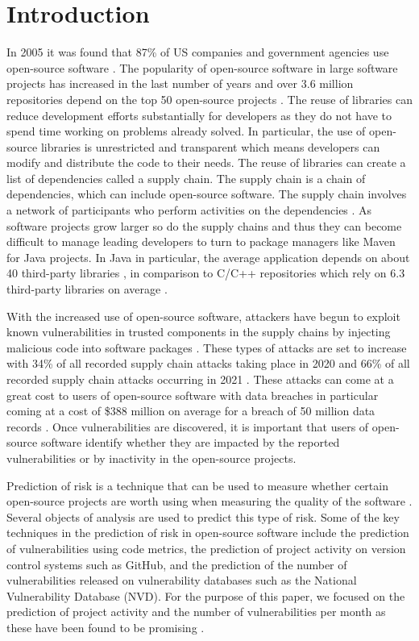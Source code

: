 \documentclass[conference]{IEEEtran}
\begin{document}
\section{Introduction}
In 2005 it was found that 87\% of US companies and government agencies use open-source software \cite{i_ceh_analysis_2021}. The popularity of open-source software in large software projects has increased in the last number of years \cite{zajdel_open_2022} and over 3.6 million repositories depend on the top 50 open-source projects \cite{subramanian_empirical_2020}. The reuse of libraries can reduce development efforts substantially for developers as they do not have to spend time working on problems already solved. In particular, the use of open-source libraries is unrestricted and transparent which means developers can modify and distribute the code to their needs. The reuse of libraries can create a list of dependencies called a supply chain. The supply chain is a chain of dependencies, which can include open-source software. The supply chain involves a network of participants who perform activities on the dependencies \cite{k_singi_trusted_2019}. As software projects grow larger so do the supply chains and thus they can become difficult to manage leading developers to turn to package managers like Maven for Java projects. In Java in particular, the average application depends on about 40 third-party libraries \cite{a_m_mir_effect_2023}, in comparison to C/C++ repositories which rely on 6.3 third-party libraries on average \cite{tang_towards_2023}.

With the increased use of open-source software, attackers have begun to exploit known vulnerabilities in trusted components in the supply chains by injecting malicious code into software packages \cite{ohm_backstabbers_2020}. These types of attacks are set to increase with 34\% of all recorded supply chain attacks taking place in 2020 and 66\% of all recorded supply chain attacks occurring in 2021 \cite{m_z_malik_protection_2023}. These attacks can come at a great cost to users of open-source software with data breaches in particular coming at a cost of \$388 million on average for a breach of 50 million data records \cite{x_wang_feasibility_2021}. Once vulnerabilities are discovered, it is important that users of open-source software identify whether they are impacted by the reported vulnerabilities or by inactivity in the open-source projects. 

Prediction of risk is a technique that can be used to measure whether certain open-source projects are worth using when measuring the quality of the software \cite{abunadi_towards_2015}. Several objects of analysis are used to predict this type of risk. Some of the key techniques in the prediction of risk in open-source software include the prediction of vulnerabilities using code metrics, the prediction of project activity on version control systems such as GitHub, and the prediction of the number of vulnerabilities released on vulnerability databases such as the National Vulnerability Database (NVD). For the purpose of this paper, we focused on the prediction of project activity and the number of vulnerabilities per month as these have been found to be promising \cite{xia_predicting_2022, s_wu_vulnerability_2020}. 
\end{document}
